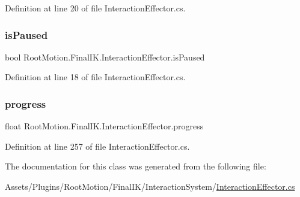 Definition at line 20 of file Interaction\+Effector.\+cs.

\mbox{\label{class_root_motion_1_1_final_i_k_1_1_interaction_effector_a516fb9d7d9b3990a66fa7ae000398554}} 
\subsubsection{\texorpdfstring{is\+Paused}{isPaused}}
{\footnotesize\ttfamily bool Root\+Motion.\+Final\+I\+K.\+Interaction\+Effector.\+is\+Paused\hspace{0.3cm}{\ttfamily [get]}}



Definition at line 18 of file Interaction\+Effector.\+cs.

\mbox{\label{class_root_motion_1_1_final_i_k_1_1_interaction_effector_ac3901437a7c632c045991eba167c2dc7}} 
\subsubsection{\texorpdfstring{progress}{progress}}
{\footnotesize\ttfamily float Root\+Motion.\+Final\+I\+K.\+Interaction\+Effector.\+progress\hspace{0.3cm}{\ttfamily [get]}}



Definition at line 257 of file Interaction\+Effector.\+cs.



The documentation for this class was generated from the following file\+:\begin{DoxyCompactItemize}
\item 
Assets/\+Plugins/\+Root\+Motion/\+Final\+I\+K/\+Interaction\+System/\mbox{\hyperlink{_interaction_effector_8cs}{Interaction\+Effector.\+cs}}\end{DoxyCompactItemize}
